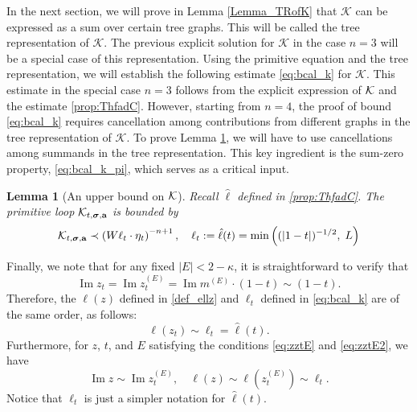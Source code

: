 \documentclass[10pt,reqno]{article}
\DeclareMathOperator{\im}{{\mathrm{Im}}}
\theoremstyle{plain} %
\newtheorem{lemma}[theorem]{Lemma}
\theoremstyle{remark}
\numberwithin{equation}{section}
\begin{document}
In the next section, we will prove in Lemma \ref{Lemma_TRofK} that $\mathcal{K}$ can be expressed as a sum over certain tree graphs. This will be called the tree representation of $\mathcal{K}$. The previous explicit solution for $\mathcal{K}$ in the case $n=3$ will be a special case of this representation. 
Using the primitive equation and the tree representation, we will establish the following estimate \eqref{eq:bcal_k} for $\mathcal{K}$. %
This estimate in the special case $n=3$ follows from the explicit expression of 
${\cal K}$ and the estimate \eqref{prop:ThfadC}. However, starting from $n=4$, the proof of bound \eqref{eq:bcal_k} requires cancellation among contributions from different graphs in the tree representation of $\mathcal{K}$.
To prove Lemma \ref{ML:Kbound}, we will have to use cancellations among summands in the tree representation. 
This key ingredient is the  sum-zero property,  \eqref{eq:bcal_k_pi}, which serves as a critical input.




\begin{lemma}[An upper bound on ${\cal K}$]\label{ML:Kbound}
Recall $\hat \ell $ defined in \eqref{prop:ThfadC}. 
The  primitive loop ${\cal K}_{t, \boldsymbol{\sigma}, \textbf{a}}$ is bounded by
\begin{equation}\label{eq:bcal_k}
  {\cal K}_{t, \boldsymbol{\sigma}, \textbf{a}}  \prec \left(W \ell_t \cdot \eta_t \right)^{-n+1},\quad  \ell_t :=\hat\ell(t)= \min\left((|1-t|)^{-1/2},\; L\right)       
\end{equation}
\end{lemma}

\bigskip

Finally, we note that for any fixed \(|E| < 2 - \kappa\), it is straightforward to verify that 
 \[
\im z_t = \im z_t^{(E)} = \im m^{(E)} \cdot (1 - t) \sim (1 - t).
\]
 Therefore, the \(\ell(z)\) defined in \eqref{def_ellz} and \(\ell_t\) defined in \eqref{eq:bcal_k} are of the same order, as follows:
 \[
\ell(z_t) \sim \ell_t = \hat{\ell}(t).
\]
Furthermore,  for \(z\), \(t\), and \(E\) satisfying the conditions \eqref{eq:zztE} and \eqref{eq:zztE2}, we have 
 \[
\im z\sim \im z^{(E)}_t,\quad \ell(z) \sim \ell(z^{(E)}_t) \sim \ell_t.
\]
Notice that \(\ell_t\) is just a simpler notation for $\hat{\ell}(t)$. 
 
\end{document}
